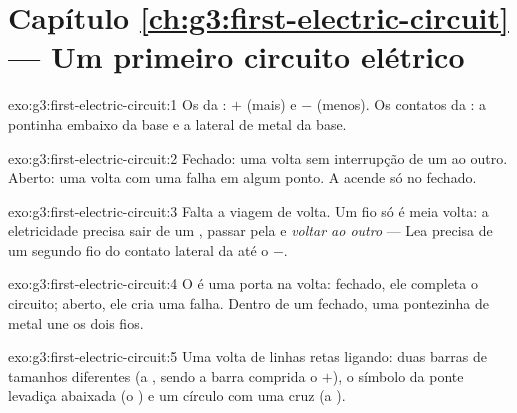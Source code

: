 \section*{Capítulo \ref{ch:g3:first-electric-circuit} --- Um primeiro circuito elétrico}

\begin{solution}{exo:g3:first-electric-circuit:1}
Os  da : $+$ (mais) e $-$ (menos). Os contatos da
: a pontinha embaixo da base e a lateral de metal da base.
\end{solution}

\begin{solution}{exo:g3:first-electric-circuit:2}
Fechado: uma volta sem interrupção de um  ao outro. Aberto:
uma volta com uma falha em algum ponto. A  acende só no
fechado.
\end{solution}

\begin{solution}{exo:g3:first-electric-circuit:3}
Falta a viagem de volta. Um fio só é meia volta: a eletricidade
precisa sair de um , passar pela  e \emph{voltar ao
outro } --- Lea precisa de um segundo fio do contato lateral
da  até o  $-$.
\end{solution}

\begin{solution}{exo:g3:first-electric-circuit:4}
O  é uma porta na volta: fechado, ele completa o circuito;
aberto, ele cria uma falha. Dentro de um  fechado, uma
pontezinha de metal une os dois fios.
\end{solution}

\begin{solution}{exo:g3:first-electric-circuit:5}
Uma volta de linhas retas ligando: duas barras de tamanhos diferentes
(a , sendo a barra comprida o $+$), o símbolo da ponte levadiça
abaixada (o ) e um círculo com uma cruz (a ).
\end{solution}

